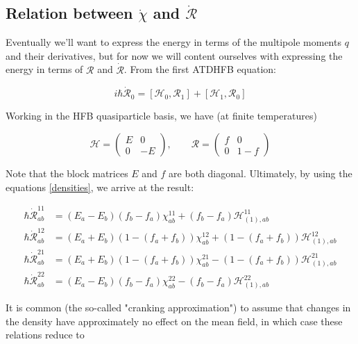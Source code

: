 \subsection*{Relation between $\dot{\chi}$ and $\dot{\mathcal{R}}$}

Eventually we'll want to express the energy in terms of the multipole moments $q$ and their derivatives, but for now we will content ourselves with expressing the energy in terms of $\mathcal{R}$ and $\dot{\mathcal{R}}$. From the first ATDHFB equation:

\begin{equation*}
i\hbar\mathcal{\dot{R}}_0 = \left[\mathcal{H}_0, \mathcal{R}_1\right] + \left[\mathcal{H}_1, \mathcal{R}_0\right]
\end{equation*}

Working in the HFB quasiparticle basis, we have (at finite temperatures)

\begin{equation*}
\mathcal{H} = 
\left(\begin{array}{cc}
E & 0 \\
0 & -E
\end{array}\right), 
\qquad \mathcal{R} = 
\left(\begin{array}{cc}
f & 0 \\
0 & 1-f
\end{array}\right)
\end{equation*}

\noindent Note that the block matrices $E$ and $f$ are both diagonal. Ultimately, by using the equations \ref{densities}, we arrive at the result:

\begin{align*}
\hbar \dot{\mathcal{R}}_{ab}^{11} &= (E_a-E_b)(f_b-f_a)\chi_{ab}^{11} + (f_b-f_a)\mathcal{H}^{11}_{(1),ab} \\
\hbar \dot{\mathcal{R}}_{ab}^{12} &= (E_a+E_b)\left(1-(f_a+f_b)\right)\chi_{ab}^{12} + \left(1-(f_a+f_b)\right)\mathcal{H}^{12}_{(1),ab} \\
\hbar \dot{\mathcal{R}}_{ab}^{21} &= (E_a+E_b)\left(1-(f_a+f_b)\right)\chi_{ab}^{21} - \left(1-(f_a+f_b)\right)\mathcal{H}^{21}_{(1),ab} \\
\hbar \dot{\mathcal{R}}_{ab}^{22} &= (E_a-E_b)(f_b-f_a)\chi_{ab}^{22} - (f_b-f_a)\mathcal{H}^{22}_{(1),ab}
\end{align*}

It is common (the so-called "cranking approximation") to assume that changes in the density have approximately no effect on the mean field, in which case these relations reduce to

